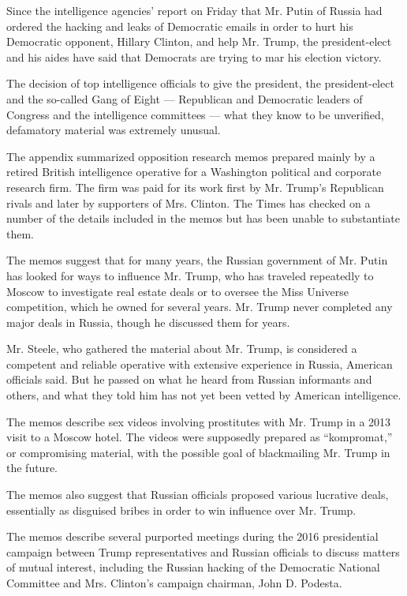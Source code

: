 Since the intelligence agencies' report on Friday that Mr. Putin of
Russia had ordered the hacking and leaks of Democratic emails in order
to hurt his Democratic opponent, Hillary Clinton, and help Mr. Trump,
the president-elect and his aides have said that Democrats are trying to
mar his election victory.

The decision of top intelligence officials to give the president, the
president-elect and the so-called Gang of Eight --- Republican and
Democratic leaders of Congress and the intelligence committees --- what
they know to be unverified, defamatory material was extremely unusual.

The appendix summarized opposition research memos prepared mainly by a
retired British intelligence operative for a Washington political and
corporate research firm. The firm was paid for its work first by Mr.
Trump's Republican rivals and later by supporters of Mrs. Clinton. The
Times has checked on a number of the details included in the memos but
has been unable to substantiate them.

The memos suggest that for many years, the Russian government of Mr.
Putin has looked for ways to influence Mr. Trump, who has traveled
repeatedly to Moscow to investigate real estate deals or to oversee the
Miss Universe competition, which he owned for several years. Mr. Trump
never completed any major deals in Russia, though he discussed them for
years.

Mr. Steele, who gathered the material about Mr. Trump, is considered a
competent and reliable operative with extensive experience in Russia,
American officials said. But he passed on what he heard from Russian
informants and others, and what they told him has not yet been vetted by
American intelligence.

The memos describe sex videos involving prostitutes with Mr. Trump in a
2013 visit to a Moscow hotel. The videos were supposedly prepared as
``kompromat,'' or compromising material, with the possible goal of
blackmailing Mr. Trump in the future.

The memos also suggest that Russian officials proposed various lucrative
deals, essentially as disguised bribes in order to win influence over
Mr. Trump.

The memos describe several purported meetings during the 2016
presidential campaign between Trump representatives and Russian
officials to discuss matters of mutual interest, including the Russian
hacking of the Democratic National Committee and Mrs. Clinton's campaign
chairman, John D. Podesta.

